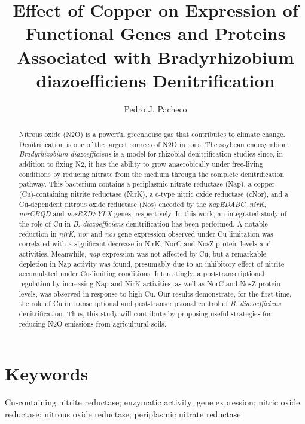 \documentclass[12pt]{article}
\title{\textbf{Effect of Copper on Expression of Functional Genes
and Proteins Associated with Bradyrhizobium
diazoefficiens Denitrification}}
\author{Pedro J. Pacheco}
\date{}
\begin{document}
\maketitle
\begin{abstract}
Nitrous oxide (N2O) is a powerful greenhouse gas that contributes to climate change.
Denitrification is one of the largest sources of N2O in soils. The soybean endosymbiont {\em Bradyrhizobium
diazoefficiens} is a model for rhizobial denitrification studies since, in addition to fixing N2, it has
the ability to grow anaerobically under free-living conditions by reducing nitrate from the medium
through the complete denitrification pathway. This bacterium contains a periplasmic nitrate reductase
(Nap), a copper (Cu)-containing nitrite reductase (NirK), a c-type nitric oxide reductase (cNor), and
a Cu-dependent nitrous oxide reductase (Nos) encoded by the {\em napEDABC}, {\em nirK}, {\em norCBQD} and
{\em nosRZDFYLX} genes, respectively. In this work, an integrated study of the role of Cu in {\em B. diazoefficiens}
denitrification has been performed. A notable reduction in {\em nirK}, {\em nor} and {\em nos} gene expression observed
under Cu limitation was correlated with a significant decrease in NirK, NorC and NosZ protein levels
and activities. Meanwhile, {\em nap} expression was not affected by Cu, but a remarkable depletion in Nap
activity was found, presumably due to an inhibitory effect of nitrite accumulated under Cu-limiting
conditions. Interestingly, a post-transcriptional regulation by increasing Nap and NirK activities, as
well as NorC and NosZ protein levels, was observed in response to high Cu. Our results demonstrate,
for the first time, the role of Cu in transcriptional and post-transcriptional control of {\em B. diazoefficiens}
denitrification. Thus, this study will contribute by proposing useful strategies for reducing N2O
emissions from agricultural soils.
\end{abstract}

\section*{Keywords}
Cu-containing nitrite reductase; enzymatic activity; gene expression; nitric oxide
reductase; nitrous oxide reductase; periplasmic nitrate reductase
\end{document}
